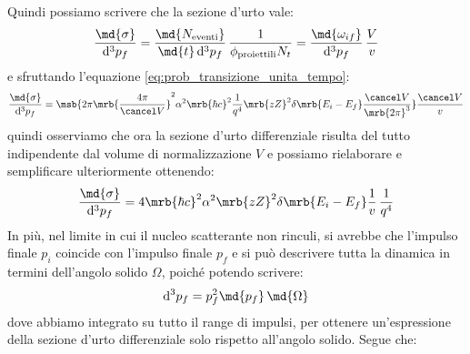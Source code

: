 Quindi possiamo scrivere che la sezione d'urto vale:
\begin{equation}
	\frac{\md{\sigma}}{\mathrm{d}^3p_f} = \frac{\md{N_\text{eventi}}}{\md{t} \,
		\mathrm{d}^3p_f} \, \frac{1}{\phi_\text{proiettili} N_t} =
	\frac{\md{\omega_{if}}}{\mathrm{d}^3p_f} \, \frac{V}{v}
\end{equation}
e sfruttando l'equazione \ref{eq:prob_transizione_unita_tempo}:
\begin{equation}
	\frac{\md{\sigma}}{\mathrm{d}^3p_f} = \msb{2\pi \mrb{\frac{4\pi}{\cancel
				V}}^2 \alpha^2 \mrb{\hbar c}^2 \frac{1}{q^4} \mrb{zZ}^2 \delta\mrb{E_i -
			E_f} \frac{\cancel V}{\mrb{2\pi}^3}} \frac{\cancel V}{v}
\end{equation}
quindi osserviamo che ora la sezione d'urto differenziale risulta del tutto
indipendente dal volume di normalizzazione $V$ e possiamo rielaborare e
semplificare ulteriormente ottenendo:
\begin{equation}
	\frac{\md{\sigma}}{\mathrm{d}^3p_f} = 4 \mrb{\hbar c}^2 \alpha^2 \mrb{zZ}^2
	\delta\mrb{E_i - E_f} \frac{1}{v} \, \frac{1}{q^4}
\end{equation}
In più, nel limite in cui il nucleo scatterante non rinculi, si avrebbe che
l'impulso finale $p_i$ coincide con l'impulso finale $p_f$ e si può descrivere
tutta la dinamica in termini dell'angolo solido $\Omega$, poiché potendo
scrivere:
\begin{equation}
	\mathrm{d}^3p_f = p_f^2 \md{p_f} \, \md{\Omega }
\end{equation}
dove abbiamo integrato su tutto il range di impulsi, per ottenere
un'espressione della sezione d'urto differenziale solo rispetto all'angolo
solido. Segue che:
